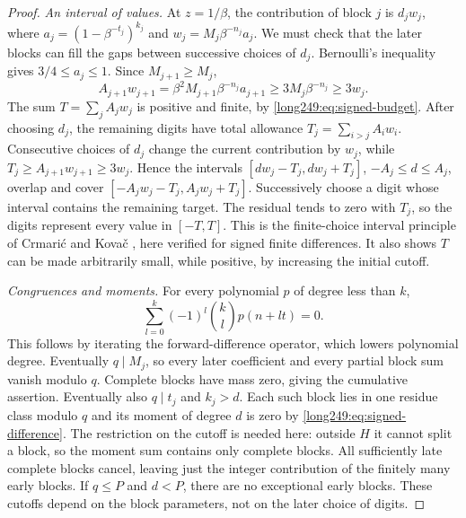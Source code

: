 \documentclass[11pt]{article}
\theoremstyle{plain}
\theoremstyle{definition}
\theoremstyle{remark}
\begin{document}
\begin{proof}
\emph{An interval of values.} At $z=1/\beta$, the contribution of
block $j$ is $d_jw_j$, where
$a_j=(1-\beta^{-t_j})^{k_j}$ and $w_j=M_j\beta^{-n_j}a_j$.
We must check that the later blocks can fill the gaps between
successive choices of $d_j$.
Bernoulli's inequality gives $3/4\le a_j\le1$. Since $M_{j+1}\ge M_j$,
\[
 A_{j+1}w_{j+1}=\beta^2M_{j+1}\beta^{-n_j}a_{j+1}
 \ge3M_j\beta^{-n_j}\ge3w_j.
\]
The sum $T=\sum_j A_jw_j$ is positive and finite, by
\eqref{long249:eq:signed-budget}. After choosing $d_j$, the remaining
digits have total allowance $T_j=\sum_{i>j}A_iw_i$. Consecutive choices
of $d_j$ change the current contribution by $w_j$, while
$T_j\ge A_{j+1}w_{j+1}\ge3w_j$. Hence the intervals
$[dw_j-T_j,dw_j+T_j]$, $-A_j\le d\le A_j$, overlap and cover
$[-A_jw_j-T_j,A_jw_j+T_j]$. Successively choose a digit whose interval
contains the remaining target. The residual tends to zero with $T_j$,
so the digits represent every value in $[-T,T]$. This is the
finite-choice interval principle of Crmari\'{c} and Kova\v{c}
\cite[Lemma~4(a), Remark~5]{crmarickovac2025signed}, here verified for
signed finite differences. It also shows $T$ can be made arbitrarily
small, while positive, by increasing the initial cutoff.

\emph{Congruences and moments.} For every polynomial $p$ of degree less
than $k$,
\begin{equation}\label{long249:eq:signed-difference}
 \sum_{l=0}^k(-1)^l\binom kl p(n+lt)=0.
\end{equation}
This follows by iterating the forward-difference operator, which lowers
polynomial degree. Eventually $q\mid M_j$, so every later coefficient
and every partial block sum vanish modulo $q$. Complete blocks have
mass zero, giving the cumulative assertion. Eventually also $q\mid t_j$
and $k_j>d$. Each such block lies in one residue class modulo $q$ and
its moment of degree $d$ is zero by \eqref{long249:eq:signed-difference}.
The restriction on the cutoff is needed here: outside $H$ it cannot
split a block, so the moment sum contains only complete blocks.
All sufficiently late complete blocks cancel, leaving just the integer
contribution of the finitely many early blocks. If $q\le P$ and $d<P$, there are no
exceptional early blocks. These cutoffs depend on the block parameters,
not on the later choice of digits.


\end{proof}
\end{document}
